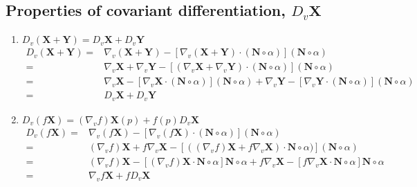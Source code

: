 \subsection{Properties of covariant differentiation, $D_v \mathbf{X}$}
\begin{enumerate}
	\item $D_v (\mathbf{X} + \mathbf{Y}) = D_v \mathbf{X} + D_v \mathbf{Y}$
	\begin{align*}
		D_v (\mathbf{X} + \mathbf{Y}) = & \nabla_v (\mathbf{X} + \mathbf{Y}) - \left[ \nabla_v (\mathbf{X}+\mathbf{Y}) \cdot (\mathbf{N} \circ \alpha) \right] (\mathbf{N} \circ \alpha) \\
		= & \nabla_v \mathbf{X} + \nabla_v \mathbf{Y} - \left[ (\nabla_v \mathbf{X} + \nabla_v \mathbf{Y}) \cdot (\mathbf{N} \circ \alpha) \right] (\mathbf{N} \circ \alpha) \\
		= & \nabla_v \mathbf{X} - \left[ \nabla_v \mathbf{X} \cdot (\mathbf{N} \circ \alpha) \right] (\mathbf{N} \circ \alpha) +  \nabla_v \mathbf{Y} - \left[ \nabla_v \mathbf{Y} \cdot (\mathbf{N} \circ \alpha) \right] (\mathbf{N} \circ \alpha)  \\
		= & D_v \mathbf{X} + D_v \mathbf{Y}
	\end{align*}
	\item $D_v (f\mathbf{X}) = (\nabla_v f)\mathbf{X}(p) + f(p) D_v \mathbf{X}$ 
	\begin{align*}
		D_v(f\mathbf{X}) = & \nabla_v (f\mathbf{X}) - \left[ \nabla_v (f\mathbf{X}) \cdot (\mathbf{N} \circ \alpha) \right] (\mathbf{N}\circ \alpha) \\
		= & (\nabla_v f) \mathbf{X} + f\nabla_v \mathbf{X} - \left[ ((\nabla_v f) \mathbf{X} + f\nabla_v \mathbf{X}) \cdot \mathbf{N} \circ \alpha) \right] (\mathbf{N} \circ \alpha) \\
		= & (\nabla_v f) \mathbf{X} - \left[ (\nabla_v f)\mathbf{X} \cdot \mathbf{N} \circ \alpha \right] \mathbf{N} \circ \alpha + f\nabla_v \mathbf{X} - \left[ f\nabla_v\mathbf{X} \cdot \mathbf{N} \circ \alpha \right] \mathbf{N} \circ \alpha \\
		= & \nabla_v f \mathbf{X} + f D_v \mathbf{X}

\end{align*}
\end{enumerate}

